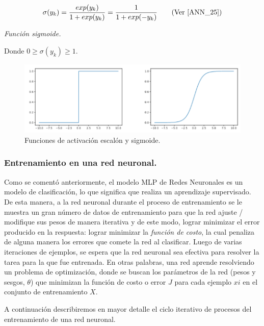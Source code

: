 \documentclass[12pt,a4paper]{article}
\begin{document}
\begin{sloppypar}
\begin{equation}\label{eq:ecuacion_8_ANN}
\sigma(y_k)= \frac{exp(y_k)}{ {1 + exp(y_k)}} =  \frac{1}{ {1+exp(-y_k)}}    \qquad \text{(Ver \cite{ANN_25})}
\end{equation}
\begin{center}
\textit{Función sigmoide.}
\end{center}

Donde $0 \geq \sigma(y_k) \geq 1$.    

\begin{figure}[H]    %
 \centering
 \includegraphics[width=1\textwidth]{images/ANN/5-ANN.png}
 \caption{Funciones de activación escalón y sigmoide\cite{ANN_25}.} 
 \label{fig:ann_5}
\end{figure}

\subsubsection{Entrenamiento en una red neuronal.}\label{entren_ann}

Como se comentó anteriormente, el modelo MLP de Redes Neuronales es un modelo de clasificación, lo que significa que realiza un aprendizaje supervisado. De esta manera, a la red neuronal durante el proceso de entrenamiento se le muestra un gran número de datos de entrenamiento para que la red ajuste / modifique sus pesos de manera iterativa y de este modo, lograr minimizar el error producido en la respuesta: lograr minimizar la \textit{función de costo}, la cual penaliza de alguna manera los errores que comete la red al clasificar. Luego de varias iteraciones de ejemplos, se espera que la red neuronal sea efectiva para resolver la tarea para la que fue entrenada.
En otras palabras, una red aprende resolviendo un problema de optimización, donde se buscan los parámetros de la red (pesos y sesgos, $\theta$) que minimizan la función de costo o error $J$ para cada ejemplo $xi$ en el conjunto de entrenamiento $X$. 

A continuación describiremos en mayor detalle el ciclo iterativo de procesos del entrenamiento de una red neuronal\cite{ANN_25}.


\end{sloppypar}
\end{document}
